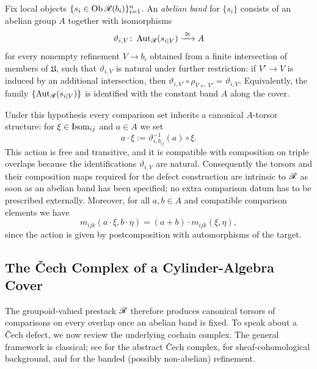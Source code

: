 \begin{definition}\label{def:abelian-band}
Fix local objects $\{s_i\in\operatorname{Ob}\mathscr{R}(b_i)\}_{i=1}^n$.  An \emph{abelian band}
for $\{s_i\}$ consists of an abelian group $A$ together with isomorphisms
\[
\vartheta_{i,V}\colon \operatorname{Aut}_{\mathscr{R}}(s_{i|V})\xrightarrow{\;\cong\;} A
\]
for every nonempty refinement $V\to b_i$ obtained from a finite intersection
of members of $\mathfrak{U}$, such that $\vartheta_{i,V}$ is natural under
further restriction: if $V'\to V$ is induced by an additional intersection,
then $\vartheta_{i,V'}\circ \rho_{V\leftarrow V'}=\vartheta_{i,V}$.  Equivalently,
the family $\{\operatorname{Aut}_{\mathscr{R}}(s_{i|V})\}$ is identified with the constant band $A$
along the cover.
\end{definition}

Under this hypothesis every comparison set inherits a canonical $A$-torsor
structure: for $\xi\in \operatorname{Isom}_{ij}$ and $a\in A$ we set
\[
a\cdot \xi := \vartheta_{i,b_{ij}}^{-1}(a)\circ \xi.
\]
This action is free and transitive, and it is compatible with composition on
triple overlaps because the identifications $\vartheta_{i,V}$ are natural.
Consequently the torsors and their composition maps required for the defect
construction are intrinsic to $\mathscr{R}$ as soon as an abelian band has been
specified; no extra comparison datum has to be prescribed externally.
Moreover, for all $a,b\in A$ and compatible comparison elements we have
\begin{equation}\label{eq:torsor-additivity}
m_{ijk}(a\cdot \xi,b\cdot \eta) = (a+b)\cdot m_{ijk}(\xi,\eta),
\end{equation}
since the action is given by postcomposition with automorphisms of the target.

\subsection{The \v{C}ech Complex of a Cylinder-Algebra Cover}
\label{subsec:cech-complex}

The groupoid-valued prestack $\mathscr{R}$ therefore produces canonical torsors of
comparisons on every overlap once an abelian band is fixed.  To speak about a
\v{C}ech defect, we now review the underlying cochain complex.  The general
framework is classical; see \cite[Tag~01FG]{StacksProject} for the abstract
\v{C}ech complex, \cite[Chapter~V]{Bredon1997SheafTheory} for
sheaf-cohomological background, and
\cite[\S IV.3]{Giraud1971CohomologieNonAbelienne} for the banded (possibly
non-abelian) refinement.

